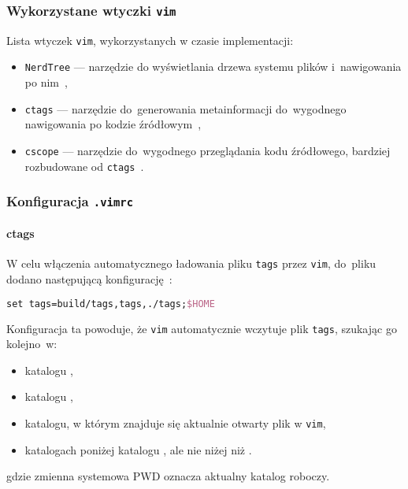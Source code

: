 \documentclass[thesis]{subfiles}
\begin{document}
\subsubsection{Wykorzystane wtyczki \texttt{vim}}

\noindent Lista wtyczek \texttt{vim}, wykorzystanych w czasie implementacji:
\begin{itemize}
	\item\texttt{NerdTree} --- narzędzie do wyświetlania drzewa systemu plików i~nawigowania po nim~\cite{nerdtree-vimorg,nerdtree-github},
	\item\texttt{ctags} --- narzędzie do~generowania metainformacji do~wygodnego nawigowania po kodzie źródłowym~\cite{ctags},
	\item\texttt{cscope} --- narzędzie do~wygodnego przeglądania kodu źródłowego, bardziej rozbudowane od \texttt{ctags}~\cite{cscope}.
\end{itemize}

\subsubsection{Konfiguracja \texttt{.vimrc}}


\paragraph{ctags}

W celu włączenia automatycznego ładowania pliku \texttt{tags} przez \texttt{vim}, do~pliku \mbox{} dodano następującą konfigurację~\cite{ctags,ctags-tricks}:
\begin{lstlisting}[language=tex,numbers=none,caption={Konfiguracja \texttt{ctags} w~\texttt{.vimrc}}]
set tags=build/tags,tags,./tags;$HOME
\end{lstlisting}
Konfiguracja ta powoduje, że \texttt{vim} automatycznie wczytuje plik \texttt{tags}, szukając go kolejno~w:
\begin{itemize}[font=\ttfamily]
	\item katalogu ,
	\item katalogu ,
	\item katalogu, w którym znajduje się aktualnie otwarty plik w \texttt{vim},
	\item katalogach poniżej katalogu , ale nie niżej niż .
\end{itemize}
gdzie zmienna systemowa \gls{PWD} oznacza aktualny katalog roboczy.
\end{document}
